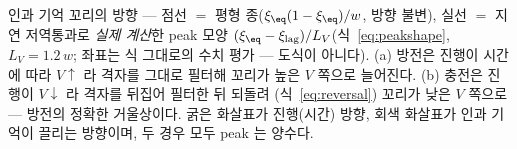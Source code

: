 \caption{인과 기억 꼬리의 방향 --- 점선 $=$ 평형 종($\xi_\eq(1-\xi_\eq)/w$, 방향 불변), 실선 $=$ 지연
저역통과로 \emph{실제 계산}한 peak 모양 $(\xi_\eq-\xi_\mathrm{lag})/L_V$(식~\eqref{eq:peakshape}, $L_V{=}1.2\,w$;
좌표는 식 그대로의 수치 평가 --- 도식이 아니다). (a) 방전은 진행이 시간에 따라 $V\!\uparrow$ 라 격자를 그대로
필터해 꼬리가 높은 $V$ 쪽으로 늘어진다. (b) 충전은 진행이 $V\!\downarrow$ 라 격자를 뒤집어 필터한 뒤 되돌려
(식~\eqref{eq:reversal}) 꼬리가 낮은 $V$ 쪽으로 --- 방전의 정확한 거울상이다. 굵은 화살표가 진행(시간) 방향,
회색 화살표가 인과 기억이 끌리는 방향이며, 두 경우 모두 peak 는 양수다.}
\label{fig:reversal}
